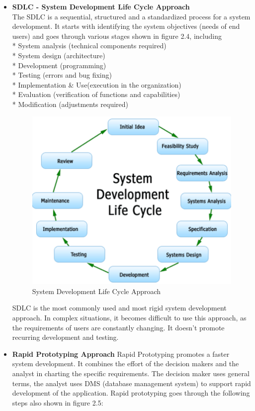 \begin{itemize}
	\item \textbf{SDLC - System Development Life Cycle Approach}\\
	The SDLC is a sequential, structured and a standardized process for a system development. It starts with identifying the system objectives (needs of end users) and goes through various stages shown in figure 2.4\cite{SDLC}, including \\
	* System analysis (technical components required)\\
	* System design (architecture)\\
	* Development (programming)\\
	* Testing (errors and bug fixing)\\
	* Implementation \& Use(execution in the organization)\\
	* Evaluation (verification of functions and capabilities)\\
	* Modification (adjustments required)\\
\begin{figure}[H]
\centering
\includegraphics[scale=0.5]{Images/SLDC.png}
\caption[System Development Life Cycle Approach]{System Development Life Cycle Approach \cite{SDLC}}
\end{figure}
SDLC is the most commonly used and most rigid system development approach. In complex situations, it becomes difficult to use this approach, as the requirements of users are constantly changing. It doesn’t promote recurring development and testing.\cite{DSS}
	\item \textbf{Rapid Prototyping Approach}
Rapid Prototyping promotes a faster system development. It combines the effort of the decision makers and the analyst in charting the specific requirements. The decision maker uses general terms, the analyst uses DMS (database management system) to support rapid development of the application.\cite{DSS} Rapid prototyping goes through the following steps also shown in figure 2.5:\\

\end{itemize}
